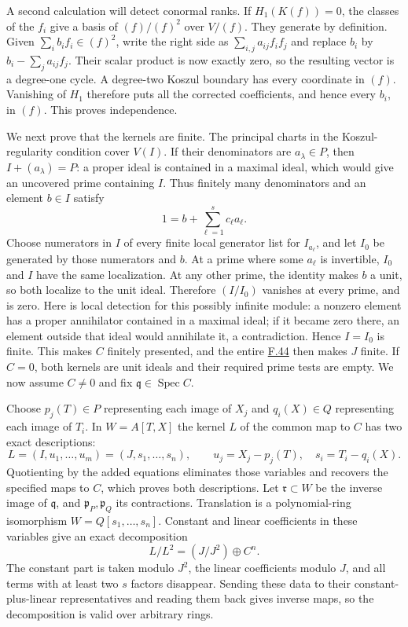 \documentclass[11pt,a4paper,openany]{report}
\begin{document}
A second calculation will detect conormal ranks. If \(H_1(K(f))=0\), the classes of the \(f_i\) give a basis of \((f)/(f)^2\) over \(V/(f)\). They generate by definition. Given \(\sum_i b_if_i\in(f)^2\), write the right side as \(\sum_{i,j}a_{ij}f_if_j\) and replace \(b_i\) by \(b_i-\sum_j a_{ij}f_j\). Their scalar product is now exactly zero, so the resulting vector is a degree-one cycle. A degree-two Koszul boundary has every coordinate in \((f)\). Vanishing of \(H_1\) therefore puts all the corrected coefficients, and hence every \(b_i\), in \((f)\). This proves independence.

We next prove that the kernels are finite. The principal charts in the Koszul-regularity condition cover \(V(I)\). If their denominators are \(a_\lambda\in P\), then \(I+(a_\lambda)=P\): a proper ideal is contained in a maximal ideal, which would give an uncovered prime containing \(I\). Thus finitely many denominators and an element \(b\in I\) satisfy \[1=b+\sum_{\ell=1}^s c_\ell a_\ell.\] Choose numerators in \(I\) of every finite local generator list for \(I_{a_\ell}\), and let \(I_0\) be generated by those numerators and \(b\). At a prime where some \(a_\ell\) is invertible, \(I_0\) and \(I\) have the same localization. At any other prime, the identity makes \(b\) a unit, so both localize to the unit ideal. Therefore \((I/I_0)\) vanishes at every prime, and is zero. Here is local detection for this possibly infinite module: a nonzero element has a proper annihilator contained in a maximal ideal; if it became zero there, an element outside that ideal would annihilate it, a contradiction. Hence \(I=I_0\) is finite. This makes \(C\) finitely presented, and the entire \hyperref[AG-RG-S05-algebra-lemma-finite-presentation-independent]{F.44} then makes \(J\) finite. If \(C=0\), both kernels are unit ideals and their required prime tests are empty. We now assume \(C\ne0\) and fix \(\mathfrak q\in\operatorname{Spec}C\).

Choose \(p_j(T)\in P\) representing each image of \(X_j\) and \(q_i(X)\in Q\) representing each image of \(T_i\). In \(W=A[T,X]\) the kernel \(L\) of the common map to \(C\) has two exact descriptions: \[L=(I,u_1,\ldots,u_m)=(J,s_1,\ldots,s_n),\qquad
u_j=X_j-p_j(T),\quad s_i=T_i-q_i(X).\] Quotienting by the added equations eliminates those variables and recovers the specified maps to \(C\), which proves both descriptions. Let \(\mathfrak r\subset W\) be the inverse image of \(\mathfrak q\), and \(\mathfrak p_P,\mathfrak p_Q\) its contractions. Translation is a polynomial-ring isomorphism \(W=Q[s_1,\ldots,s_n]\). Constant and linear coefficients in these variables give an exact decomposition \[L/L^2=(J/J^2)\oplus C^n.\] The constant part is taken modulo \(J^2\), the linear coefficients modulo \(J\), and all terms with at least two \(s\) factors disappear. Sending these data to their constant-plus-linear representatives and reading them back gives inverse maps, so the decomposition is valid over arbitrary rings.
\end{document}
